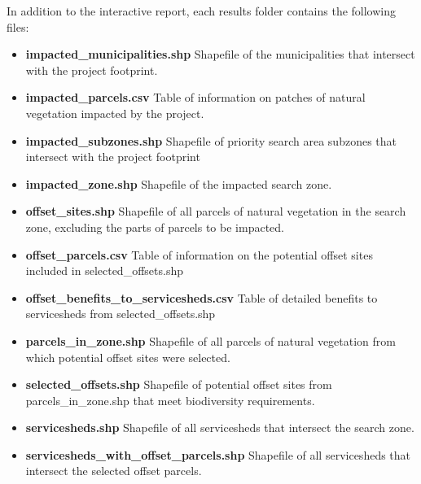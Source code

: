 \documentclass[11pt,letterpaper]{report}
\begin{document}
	In addition to the interactive report, each results folder contains the following files:
	
	\begin{adjustwidth}{0.25in}{}
			
	\begin{itemize}
		\item \textbf{impacted\_{}municipalities.shp} Shapefile of the municipalities that intersect with the project footprint.
		
		\item \textbf{impacted\_{}parcels.csv} Table of information on patches of natural vegetation impacted by the project.
		
		\item \textbf{impacted\_{}subzones.shp} Shapefile of priority search area subzones that intersect with the project footprint
		
		\item \textbf{impacted\_{}zone.shp} Shapefile of the impacted search zone.
		
		\item \textbf{offset\_{}sites.shp} Shapefile of all parcels of natural vegetation in the search zone, excluding the parts of parcels to be impacted.
		
		\item \textbf{offset\_{}parcels.csv} Table of information on the potential offset sites included in selected\_{}offsets.shp
		
		\item \textbf{offset\_{}benefits\_{}to\_{}servicesheds.csv} Table of detailed benefits to servicesheds from selected\_{}offsets.shp
		
		\item \textbf{parcels\_{}in\_{}zone.shp} Shapefile of all parcels of natural vegetation from which potential offset sites were selected.
		
		\item \textbf{selected\_{}offsets.shp}  Shapefile of potential offset sites from parcels\_{}in\_{}zone.shp that meet biodiversity requirements.
		
		\item \textbf{servicesheds.shp} Shapefile of all servicesheds that intersect the search zone.
		
		\item \textbf{servicesheds\_{}with\_{}offset\_{}parcels.shp} Shapefile of all servicesheds that intersect the selected offset parcels.
	\end{itemize}
	\end{adjustwidth}
\end{document}
